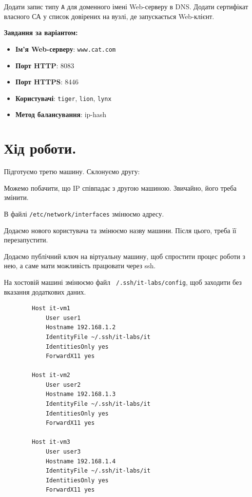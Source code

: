 \documentclass[14pt, a4paper]{extreport}
\begin{document}
	Додати запис типу \texttt{A} для доменного імені Web-серверу в DNS. Додати сертифікат власного СА у список довірених на вузлі, де запускається Web-клієнт.
	
	\textbf{Завдання за варіантом:}
	
	\begin{itemize}
		\item \textbf{Ім'я Web-серверу}: \texttt{www.cat.com}
		
		\item \textbf{Порт HTTP}: 8083
		
		\item \textbf{Порт HTTPS}: 8446
		
		\item \textbf{Користувачі}: \texttt{tiger}, \texttt{lion}, \texttt{lynx}
		
		\item \textbf{Метод балансування}: ip-hash
	\end{itemize}
	
	\section*{Хід роботи.}
	
	Підготуємо третю машину. Склонуємо другу:
	
	
	Можемо побачити, що IP співпадає з другою машиною. Звичайно, його треба змінити. \sideat{[VM 3]}
	
	
	В файлі \texttt{/etc/network/interfaces} змінюємо адресу. \sideat{[VM 3]}
	
	
	Додаємо нового користувача та змінюємо назву машини. Після цього, треба її перезапустити. \sideat{[VM 3]}
	
	
	Додаємо публічний ключ на віртуальну машину, щоб спростити процес роботи з нею, а саме мати можливість працювати через ssh. \sideat{[LOCAL]}
	
	
	На хостовій машині змінюємо файл \texttt{~/.ssh/it-labs/config}, щоб заходити без вказання додаткових даних. \sideat{[LOCAL]}
	
	\begin{verbatim}
		Host it-vm1
			User user1
			Hostname 192.168.1.2
			IdentityFile ~/.ssh/it-labs/it
			IdentitiesOnly yes
			ForwardX11 yes
		
		Host it-vm2
			User user2
			Hostname 192.168.1.3
			IdentityFile ~/.ssh/it-labs/it
			IdentitiesOnly yes
			ForwardX11 yes
		
		Host it-vm3
			User user3
			Hostname 192.168.1.4
			IdentityFile ~/.ssh/it-labs/it
			IdentitiesOnly yes
			ForwardX11 yes
	\end{verbatim}
	
\end{document}

